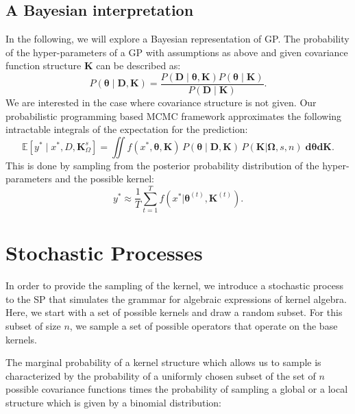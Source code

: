 \documentclass{article} %
\begin{document}
\subsection{A Bayesian interpretation}
In the following, we will explore a Bayesian representation of GP. The probability of the hyper-parameters of a GP with assumptions as above and given covariance function structure $\mathbf{K}$ can be described as:
\begin{equation}
\label{eq:hyperProbability}
P(\bm{\theta} \mid \mathbf{D,K}) = \frac{P(\mathbf{D} \mid \bm{\theta}, \mathbf{K})P(\bm{\theta} \mid  \mathbf{K})}{P(\mathbf{D} \mid \mathbf{K})}.
\end{equation}
We are interested in the case where covariance structure is not given. Our probabilistic programming based MCMC framework approximates the following intractable integrals of the expectation for the prediction:
\begin{equation}
\mathbb{E}[y^* \mid x^*,D,\mathbf{K}^s_{\Omega}] =\iint f(x^*,\bm{\theta},\mathbf{K})\,P(\bm{\theta} \mid \mathbf{D,\mathbf{K}})\,P(\mathbf{K}|\bm{\Omega},s,n) \; \mathbf{d} \bm{\theta} \mathbf{d} \mathbf{K}.  
\end{equation}
This is done by sampling from the posterior probability distribution of the hyper-parameters and the possible kernel:
\begin{equation}
y^* \approx \frac{1}{T} \sum^T_{t=1} f(x^* | \bm{\theta}^{(t)},\mathbf{K}^{(t)}). 
\end{equation}





\section{Stochastic Processes}
In order to provide the sampling of the kernel, we introduce a stochastic process to the SP that simulates the grammar for algebraic expressions of kernel algebra. Here, we start with a set of possible kernels and draw a random subset. For this subset of size $n$, we sample a set of possible operators that operate on the base kernels. 

The marginal probability of a kernel structure which allows us to sample  is characterized by the probability of a uniformly chosen subset of the set of $n$ possible covariance functions times the probability of sampling a global or a local structure which is given by a binomial distribution: 
\end{document}
